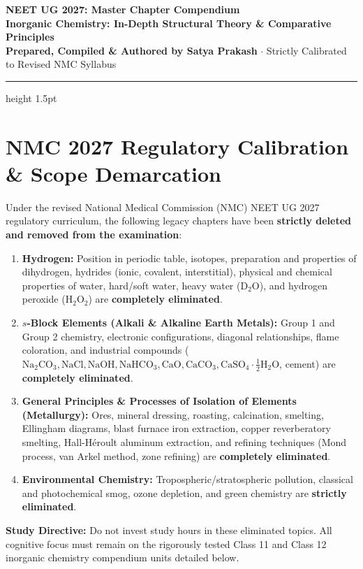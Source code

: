 \documentclass[10pt,a4paper]{article}
\begin{document}
\begin{center}
  {\Huge \textbf{NEET UG 2027: Master Chapter Compendium}}\\[6pt]
  {\Large \textbf{Inorganic Chemistry: In-Depth Structural Theory \& Comparative Principles}}\\[4pt]
  {\small \textbf{Prepared, Compiled \& Authored by Satya Prakash} $\cdot$ Strictly Calibrated to Revised NMC Syllabus}
  \vspace{4pt}
  \hrule height 1.5pt
\end{center}

\section{NMC 2027 Regulatory Calibration \& Scope Demarcation}

\begin{trapbox}
Under the revised National Medical Commission (NMC) NEET UG 2027 regulatory curriculum, the following legacy chapters have been \textbf{strictly deleted and removed from the examination}:
\begin{enumerate}
  \item \textbf{Hydrogen:} Position in periodic table, isotopes, preparation and properties of dihydrogen, hydrides (ionic, covalent, interstitial), physical and chemical properties of water, hard/soft water, heavy water ($\mathrm{D_2O}$), and hydrogen peroxide ($\mathrm{H_2O_2}$) are \textbf{completely eliminated}.
  \item \textbf{$s$-Block Elements (Alkali \& Alkaline Earth Metals):} Group 1 and Group 2 chemistry, electronic configurations, diagonal relationships, flame coloration, and industrial compounds ($\mathrm{Na_2CO_3, NaCl, NaOH, NaHCO_3, CaO, CaCO_3, CaSO_4\cdot \frac{1}{2}H_2O}$, cement) are \textbf{completely eliminated}.
  \item \textbf{General Principles \& Processes of Isolation of Elements (Metallurgy):} Ores, mineral dressing, roasting, calcination, smelting, Ellingham diagrams, blast furnace iron extraction, copper reverberatory smelting, Hall-Héroult aluminum extraction, and refining techniques (Mond process, van Arkel method, zone refining) are \textbf{completely eliminated}.
  \item \textbf{Environmental Chemistry:} Tropospheric/stratospheric pollution, classical and photochemical smog, ozone depletion, and green chemistry are \textbf{strictly eliminated}.
\end{enumerate}
\textbf{Study Directive:} Do not invest study hours in these eliminated topics. All cognitive focus must remain on the rigorously tested Class 11 and Class 12 inorganic chemistry compendium units detailed below.
\end{trapbox}
\end{document}
